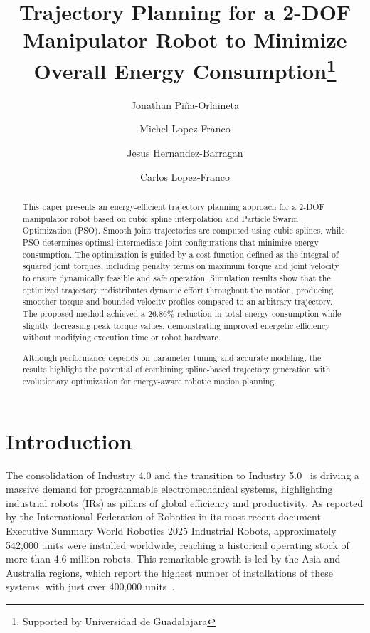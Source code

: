 \documentclass[runningheads]{llncs}
\begin{document}
%
\title{Trajectory Planning for a 2-DOF Manipulator Robot to Minimize Overall Energy Consumption\thanks{Supported by Universidad de Guadalajara}}
%
\author{Jonathan Piña-Orlaineta \and Michel Lopez-Franco \and Jesus Hernandez-Barragan \and Carlos Lopez-Franco}
%
%
%
\maketitle

\begin{abstract}
This paper presents an energy-efficient trajectory planning approach for a 2-DOF manipulator robot based on cubic spline interpolation and Particle Swarm Optimization (PSO). Smooth joint trajectories are computed using cubic splines, while PSO determines optimal intermediate joint configurations that minimize energy consumption. The optimization is guided by a cost function defined as the integral of squared joint torques, including penalty terms on maximum torque and joint velocity to ensure dynamically feasible and safe operation. Simulation results show that the optimized trajectory redistributes dynamic effort throughout the motion, producing smoother torque and bounded velocity profiles compared to an arbitrary trajectory. The proposed method achieved a 26.86\% reduction in total energy consumption while slightly decreasing peak torque values, demonstrating improved energetic efficiency without modifying execution time or robot hardware. 

Although performance depends on parameter tuning and accurate modeling, the results highlight the potential of combining spline-based trajectory generation with evolutionary optimization for energy-aware robotic motion planning.

\end{abstract}
%
%
%
\section{Introduction}
The consolidation of Industry 4.0 and the transition to Industry 5.0~\cite{ref_industry5.0,ref_ind5.0_capabilities} is driving a massive demand for programmable electromechanical systems, highlighting industrial robots (IRs) as pillars of global efficiency and productivity. As reported by the International Federation of Robotics in its most recent document Executive Summary World Robotics 2025 Industrial Robots, approximately 542,000 units were installed worldwide, reaching a historical operating stock of more than 4.6 million robots. This remarkable growth is led by the Asia and Australia regions, which report the highest number of installations of these systems, with just over 400,000 units~\cite{ref_wr2025}.
\end{document}
